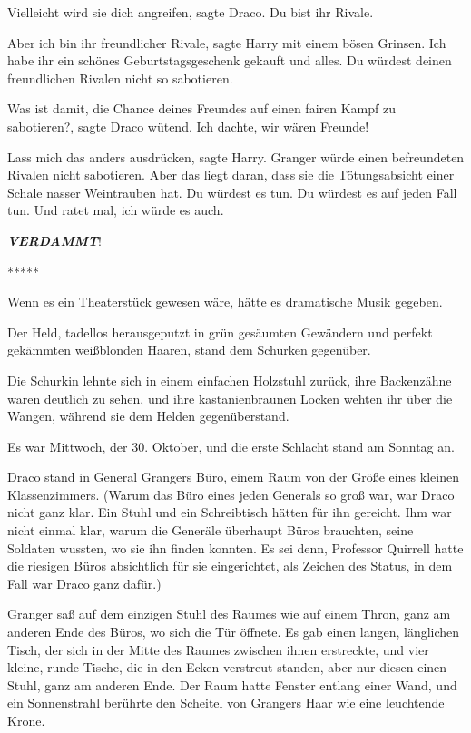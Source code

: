 \glqq{}Vielleicht wird sie dich angreifen\grqq{}, sagte Draco. \glqq{}Du bist
ihr Rivale.\grqq{}

\glqq{}Aber ich bin ihr freundlicher Rivale\grqq{}, sagte Harry mit einem bösen
Grinsen. \glqq{}Ich habe ihr ein schönes Geburtstagsgeschenk gekauft und alles.
Du würdest deinen freundlichen Rivalen nicht so sabotieren.\grqq{}

\glqq{}Was ist damit, die Chance deines Freundes auf einen fairen Kampf zu
sabotieren?\grqq{}, sagte Draco wütend. \glqq{}Ich dachte, wir wären
Freunde!\grqq{}

\glqq{}Lass mich das anders ausdrücken\grqq{}, sagte Harry. \glqq{}Granger würde
einen befreundeten Rivalen nicht sabotieren. Aber das liegt daran, dass sie die
Tötungsabsicht einer Schale nasser Weintrauben hat. Du würdest es tun. Du
würdest es auf jeden Fall tun. Und ratet mal, ich würde es auch.\grqq{}

\textbf{\emph{VERDAMMT}}!

\begin{center}*****\end{center}

Wenn es ein Theaterstück gewesen wäre, hätte es dramatische Musik gegeben.

Der Held, tadellos herausgeputzt in grün gesäumten Gewändern und perfekt
gekämmten weißblonden Haaren, stand dem Schurken gegenüber.

Die Schurkin lehnte sich in einem einfachen Holzstuhl zurück, ihre Backenzähne
waren deutlich zu sehen, und ihre kastanienbraunen Locken wehten ihr über die
Wangen, während sie dem Helden gegenüberstand.

Es war Mittwoch, der 30. Oktober, und die erste Schlacht stand am Sonntag an.

Draco stand in General Grangers Büro, einem Raum von der Größe eines kleinen
Klassenzimmers. (Warum das Büro eines jeden Generals so groß war, war Draco
nicht ganz klar. Ein Stuhl und ein Schreibtisch hätten für ihn gereicht. Ihm war
nicht einmal klar, warum die Generäle überhaupt Büros brauchten, seine Soldaten
wussten, wo sie ihn finden konnten. Es sei denn, Professor Quirrell hatte die
riesigen Büros absichtlich für sie eingerichtet, als Zeichen des Status, in dem
Fall war Draco ganz dafür.)

Granger saß auf dem einzigen Stuhl des Raumes wie auf einem Thron, ganz am
anderen Ende des Büros, wo sich die Tür öffnete. Es gab einen langen, länglichen
Tisch, der sich in der Mitte des Raumes zwischen ihnen erstreckte, und vier
kleine, runde Tische, die in den Ecken verstreut standen, aber nur diesen einen
Stuhl, ganz am anderen Ende. Der Raum hatte Fenster entlang einer Wand, und ein
Sonnenstrahl berührte den Scheitel von Grangers Haar wie eine leuchtende Krone.

